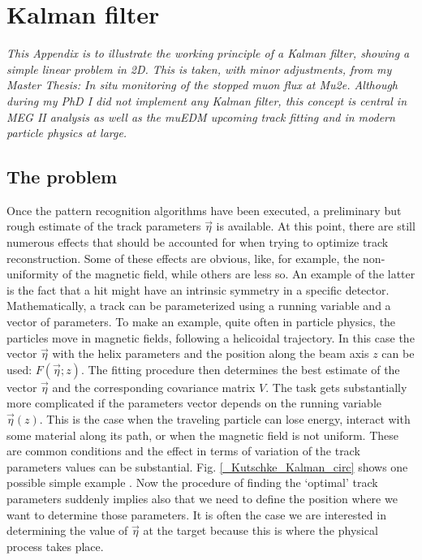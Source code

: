 \chapter{Kalman filter}
\begin{refsection}
{\itshape
This Appendix is to illustrate the working principle of a Kalman filter, showing a simple linear problem in 2D. This is taken, with minor adjustments, from my Master Thesis: In situ monitoring of the stopped muon flux at Mu2e. Although during my PhD I did not implement any Kalman filter, this concept is central in MEG II analysis as well as the muEDM upcoming track fitting and in modern particle physics at large.}
\label{ch:Kalman}

\section{The problem}
    Once the pattern recognition algorithms have been executed, a preliminary but rough estimate of the track parameters $\vec{\eta}$ is available. 
    At this point, there are still numerous effects that should be accounted for when trying to optimize track reconstruction. 
    Some of these effects are obvious, like, for example, the non-uniformity of the magnetic field, while others are less so. 
    An example of the latter is the fact that a hit might have an intrinsic symmetry in a specific detector. \\

    \noindent
    Mathematically, a track can be parameterized using a running variable and a vector of parameters. 
    To make an example, quite often in particle physics, the particles move in magnetic fields, following a helicoidal trajectory. 
    In this case the vector $\vec{\eta}$ with the helix parameters and the position along the beam axis $z$ can be used: $F(\vec{\eta};z)$. 
    The fitting procedure then determines the best estimate of the vector $\vec{\eta}$ and the corresponding covariance matrix $V$. 
    The task gets substantially more complicated if the parameters vector depends on the running variable $\vec{\eta}(z)$. 
    This is the case when the traveling particle can lose energy, interact with some material along its path, or when the magnetic field is not uniform. 
    These are common conditions and the effect in terms of variation of the track parameters values can be substantial.
    Fig. \ref{_Kutschke_Kalman_circ} shows one possible simple example \cite{Kutschke}.
    Now the procedure of finding the `optimal' track parameters suddenly implies also that we need to define the position where we want to determine those parameters.
    It is often the case we are interested in determining the value of $\vec{\eta}$ at the target because this is where the physical process takes place. 


\end{refsection}
